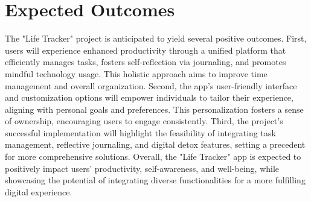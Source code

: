 \section*{Expected Outcomes}
The "Life Tracker" project is anticipated to yield several positive outcomes. First, users will experience enhanced productivity through a unified platform that efficiently manages tasks, fosters self-reflection via journaling, and promotes mindful technology usage. This holistic approach aims to improve time management and overall organization. Second, the app's user-friendly interface and customization options will empower individuals to tailor their experience, aligning with personal goals and preferences. This personalization fosters a sense of ownership, encouraging users to engage consistently. Third, the project's successful implementation will highlight the feasibility of integrating task management, reflective journaling, and digital detox features, setting a precedent for more comprehensive solutions. Overall, the "Life Tracker" app is expected to positively impact users' productivity, self-awareness, and well-being, while showcasing the potential of integrating diverse functionalities for a more fulfilling digital experience.